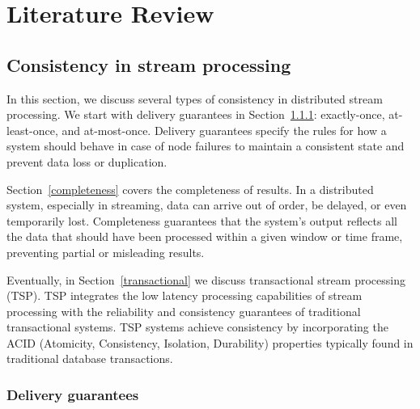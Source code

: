 \chapter{Literature Review}
\label{thesis-chapter-literature-review}

\section{Consistency in stream processing}
\label{consistency_overview}

In this section, we discuss several types of consistency in distributed stream processing. We start with delivery guarantees in Section~\ref{delivery_guarantees}: exactly-once, at-least-once, and at-most-once. Delivery guarantees specify the rules for how a system should behave in case of node failures to maintain a consistent state and prevent data loss or duplication.

Section~\ref{completeness} covers the completeness of results.  In a distributed system, especially in streaming, data can arrive out of order, be delayed, or even temporarily lost. Completeness guarantees that the system's output reflects all the data that should have been processed within a given window or time frame, preventing partial or misleading results.

Eventually, in Section~\ref{transactional} we discuss transactional stream processing (TSP). TSP integrates the low latency processing capabilities of stream processing with the reliability and consistency guarantees of traditional transactional systems. TSP systems achieve consistency by incorporating the ACID (Atomicity, Consistency, Isolation, Durability) properties typically found in traditional database transactions.


\subsection{Delivery guarantees}
\label{delivery_guarantees}

